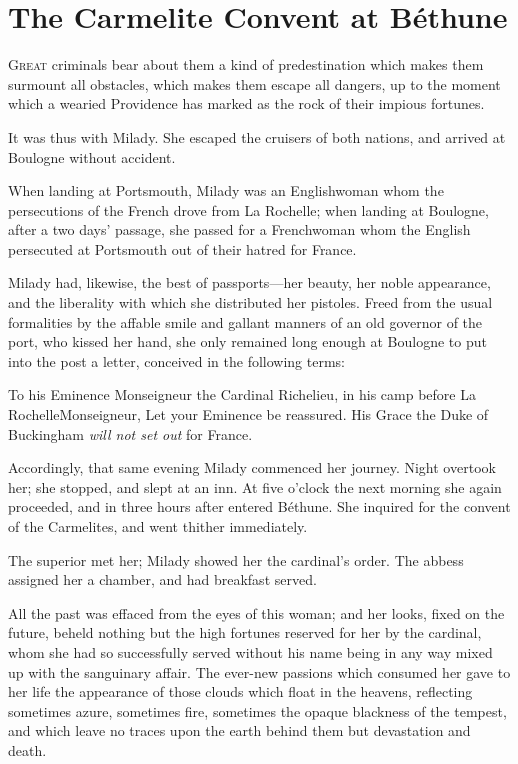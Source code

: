 
\chapter{The Carmelite Convent at Béthune}

\lettrine[]{G}{reat} criminals bear about them a kind of predestination which makes them surmount all obstacles, which makes them escape all dangers, up to the moment which a wearied Providence has marked as the rock of their impious fortunes. 

It was thus with Milady. She escaped the cruisers of both nations, and arrived at Boulogne without accident. 

When landing at Portsmouth, Milady was an Englishwoman whom the persecutions of the French drove from La Rochelle; when landing at Boulogne, after a two days' passage, she passed for a Frenchwoman whom the English persecuted at Portsmouth out of their hatred for France. 

Milady had, likewise, the best of passports---her beauty, her noble appearance, and the liberality with which she distributed her pistoles. Freed from the usual formalities by the affable smile and gallant manners of an old governor of the port, who kissed her hand, she only remained long enough at Boulogne to put into the post a letter, conceived in the following terms:

\begin{mail}{To his Eminence Monseigneur the Cardinal Richelieu, in his camp before La Rochelle}{Monseigneur,} 
	Let your Eminence be reassured. His Grace the Duke of Buckingham \textit{will not set out} for France. 
\end{mail}

Accordingly, that same evening Milady commenced her journey. Night overtook her; she stopped, and slept at an inn. At five o'clock the next morning she again proceeded, and in three hours after entered Béthune. She inquired for the convent of the Carmelites, and went thither immediately. 

The superior met her; Milady showed her the cardinal's order. The abbess assigned her a chamber, and had breakfast served. 

All the past was effaced from the eyes of this woman; and her looks, fixed on the future, beheld nothing but the high fortunes reserved for her by the cardinal, whom she had so successfully served without his name being in any way mixed up with the sanguinary affair. The ever-new passions which consumed her gave to her life the appearance of those clouds which float in the heavens, reflecting sometimes azure, sometimes fire, sometimes the opaque blackness of the tempest, and which leave no traces upon the earth behind them but devastation and death. 

